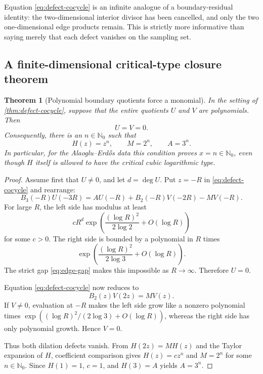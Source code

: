 \documentclass[11pt,oneside]{article}
\newtheorem{theorem}{Theorem}[section]
\theoremstyle{definition}
\theoremstyle{remark}
\newcommand{\Nzero}{\mathbb N_0}
\newcommand{\AEconj}{Alaoglu--Erd\H{o}s}
\begin{document}
Equation \eqref{eq:defect-cocycle} is an infinite analogue of a boundary-residual identity: the two-dimensional interior divisor has been cancelled, and only the two one-dimensional edge products remain.  This is strictly more informative than saying merely that each defect vanishes on the sampling set.

\subsection{A finite-dimensional critical-type closure theorem}

\begin{theorem}[Polynomial boundary quotients force a monomial]
\label{thm:polynomial-quotients}
In the setting of \cref{thm:defect-cocycle}, suppose that the entire quotients \(U\) and \(V\) are polynomials.  Then
\[
  U=V=0.
\]
Consequently, there is an \(n\in\Nzero\) such that
\[
  H(z)=z^n,\qquad M=2^n,\qquad A=3^n.
\]
In particular, for the \AEconj{} data this condition proves \(x=n\in\Nzero\), even though \(H\) itself is allowed to have the critical cubic logarithmic type.
\end{theorem}

\begin{proof}
Assume first that \(U\ne0\), and let \(d=\deg U\).  Put \(z=-R\) in \eqref{eq:defect-cocycle} and rearrange:
\begin{equation}
  B_3(-R)U(-3R)
  =A U(-R)+B_2(-R)V(-2R)-M V(-R).
  \label{eq:negative-axis-cocycle}
\end{equation}
For large \(R\), the left side has modulus at least
\[
  cR^d\exp\left(\frac{(\log R)^2}{2\log2}+O(\log R)\right)
\]
for some \(c>0\).  The right side is bounded by a polynomial in \(R\) times
\[
  \exp\left(\frac{(\log R)^2}{2\log3}+O(\log R)\right).
\]
The strict gap \eqref{eq:edge-gap} makes this impossible as \(R\to\infty\).  Therefore \(U=0\).

Equation \eqref{eq:defect-cocycle} now reduces to
\[
  B_2(z)V(2z)=M V(z).
\]
If \(V\ne0\), evaluation at \(-R\) makes the left side grow like a nonzero polynomial times
\(\exp((\log R)^2/(2\log3)+O(\log R))\), whereas the right side has only polynomial growth.  Hence \(V=0\).

Thus both dilation defects vanish.  From \(H(2z)=MH(z)\) and the Taylor expansion of \(H\), coefficient comparison gives \(H(z)=cz^n\) and \(M=2^n\) for some \(n\in\Nzero\).  Since \(H(1)=1\), \(c=1\), and \(H(3)=A\) yields \(A=3^n\).
\end{proof}
\end{document}
